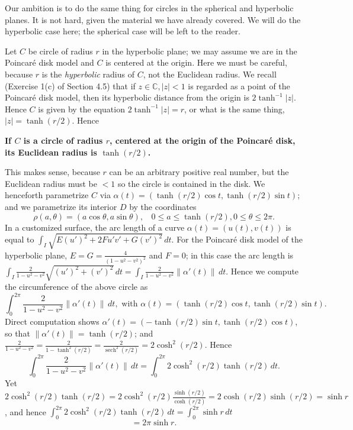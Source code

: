 \documentclass[leqno]{book}
\begin{document}
Our ambition is to do the same thing for circles in the spherical and hyperbolic planes.  It is not hard, given the material we have already covered.  We will do the hyperbolic case here; the spherical case will be left to the reader.

Let $C$ be circle of radius $r$ in the hyperbolic plane; we may assume we are in the Poincar\'e disk model and $C$ is centered at the origin.  Here we must be careful, because $r$ is the \emph{hyperbolic} radius of $C$, not the Euclidean radius.  We recall (Exercise 1(c) of Section 4.5) that if $z\in\mathbb C,|z|<1$ is regarded as a point of the Poincar\'e disk model, then its hyperbolic distance from the origin is $2\tanh^{-1}|z|$.  Hence $C$ is given by the equation $2\tanh^{-1}|z|=r$, or what is the same thing, $|z|=\tanh(r/2)$.  Hence %
\begin{center}
\textbf{If $C$ is a circle of radius $r$, centered at the origin of the Poincar\'e disk, its Euclidean radius is $\tanh(r/2)$.}
\end{center}
This makes sense, because $r$ can be an arbitrary positive real number, but the Euclidean radius must be $<1$ so the circle is contained in the disk.  We henceforth parametrize $C$ via $\alpha(t)=(\tanh(r/2)\cos t,\tanh(r/2)\sin t)$; and we parametrize its interior $D$ by the coordinates
$$\rho(a,\theta)=(a\cos\theta,a\sin\theta),~~~~0\leqslant a\leqslant\tanh(r/2),0\leqslant\theta\leqslant 2\pi.$$
In a customized surface, the arc length of a curve $\alpha(t)=(u(t),v(t))$ is equal to $\int_I\sqrt{E(u')^2+2Fu'v'+G(v')^2}\,dt$.  For the Poincar\'e disk model of the hyperbolic plane, $E=G=\frac 4{(1-u^2-v^2)^2}$ and $F=0$; in this case the arc length is $\int_I\frac 2{1-u^2-v^2}\sqrt{(u')^2+(v')^2}\,dt=\int_I\frac 2{1-u^2-v^2}\|\alpha'(t)\|\,dt$.  Hence we compute the circumference of the above circle as
$$\int_0^{2\pi}\frac 2{1-u^2-v^2}\|\alpha'(t)\|\,dt,\text{ with }\alpha(t)=(\tanh(r/2)\cos t,\tanh(r/2)\sin t).$$
Direct computation shows $\alpha'(t)=(-\tanh(r/2)\sin t,\tanh(r/2)\cos t)$, so that $\|\alpha'(t)\|=\tanh(r/2)$; and $\frac 2{1-u^2-v^2}=\frac 2{1-\tanh^2(r/2)}=\frac 2{\operatorname{sech}^2(r/2)}=2\cosh^2(r/2)$.  Hence
$$\int_0^{2\pi}\frac 2{1-u^2-v^2}\|\alpha'(t)\|\,dt=\int_0^{2\pi}2\cosh^2(r/2)\tanh(r/2)\,dt.$$
Yet $2\cosh^2(r/2)\tanh(r/2)=2\cosh^2(r/2)\frac{\sinh(r/2)}{\cosh(r/2)}=2\cosh(r/2)\sinh(r/2)=\sinh r$, and hence $\int_0^{2\pi}2\cosh^2(r/2)\tanh(r/2)\,dt=\int_0^{2\pi}\sinh r\,dt$
$$=2\pi\sinh r.$$ %
\end{document}
